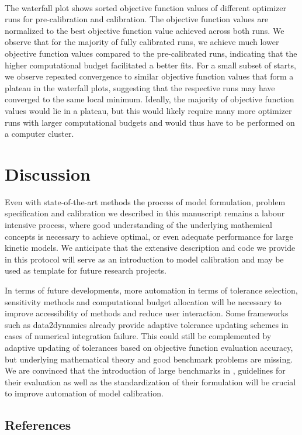 \documentclass[11pt]{article}
\begin{document}
    \begin{center}
    \end{center}
    { \hspace*{\fill} \\}
    
    The waterfall plot shows sorted objective function values of different
optimizer runs for pre-calibration and calibration. The objective
function values are normalized to the best objective function value
achieved across both runs. We observe that for the majority of fully
calibrated runs, we achieve much lower objective function values
compared to the pre-calibrated runs, indicating that the higher
computational budget facilitated a better fits. For a small subset of
starts, we observe repeated convergence to similar objective function
values that form a plateau in the waterfall plots, suggesting that the
respective runs may have converged to the same local minimum. Ideally,
the majority of objective function values would lie in a plateau, but
this would likely require many more optimizer runs with larger
computational budgets and would thus have to be performed on a computer
cluster.

    \hypertarget{discussion}{%
\section{Discussion}\label{discussion}}

Even with state-of-the-art methods the process of model formulation,
problem specification and calibration we described in this manuscript
remains a labour intensive process, where good understanding of the
underlying mathemical concepts is necessary to achieve optimal, or even
adequate performance for large kinetic models. We anticipate that the
extensive description and code we provide in this protocol will serve as
an introduction to model calibration and may be used as template for
future research projects.

In terms of future developments, more automation in terms of tolerance
selection, sensitivity methods and computational budget allocation will
be necessary to improve accessibility of methods and reduce user
interaction. Some frameworks such as data2dynamics
\cite{2754712/RYRYBYZA} already provide adaptive tolerance updating
schemes in cases of numerical integration failure. This could still be
complemented by adaptive updating of tolerances based on objective
function evaluation accuracy, but underlying mathematical theory and
good benchmark problems are missing. We are convinced that the
introduction of large benchmarks in \cite{2754712/FMD3RVCR}
\cite{2754712/INKV577L}, guidelines for their evaluation
\cite{2754712/NYMSV8TA} as well as the standardization of their
formulation \cite{2754712/86CV69R2} will be crucial to improve
automation of model calibration.

    \hypertarget{references}{%
\subsection{References}\label{references}}




    
    
    
\end{document}
